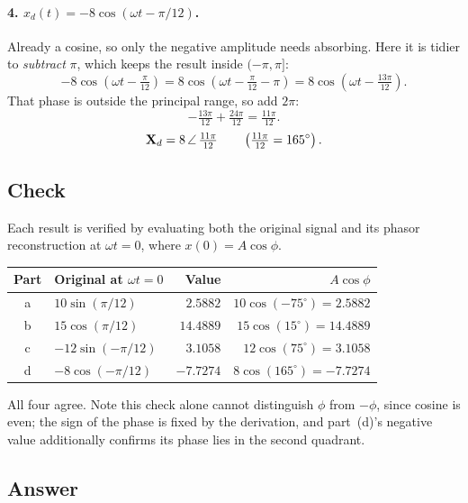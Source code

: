 \paragraph{4. $x_d(t) = -8\cos(\omega t - \pi/12)$.}
Already a cosine, so only the negative amplitude needs absorbing. Here it is
tidier to \emph{subtract} $\pi$, which keeps the result inside $(-\pi, \pi]$:
\begin{equation}
  -8\cos\!\left(\omega t - \tfrac{\pi}{12}\right)
   = 8\cos\!\left(\omega t - \tfrac{\pi}{12} - \pi\right)
   = 8\cos\!\left(\omega t - \tfrac{13\pi}{12}\right).
\end{equation}
That phase is outside the principal range, so add $2\pi$:
\begin{equation}
  -\tfrac{13\pi}{12} + \tfrac{24\pi}{12} = \tfrac{11\pi}{12}.
\end{equation}
\[
  \mathbf{X}_d = 8\,\angle\,\mathord{\tfrac{11\pi}{12}}
  \qquad \left(\tfrac{11\pi}{12} = 165^\circ\right).
\]

\subsection*{Check}

Each result is verified by evaluating both the original signal and its phasor
reconstruction at $\omega t = 0$, where $x(0) = A\cos\phi$.

\begin{center}
\begin{tabular}{clrr}
  \toprule
  Part & Original at $\omega t = 0$ & Value & $A\cos\phi$ \\
  \midrule
  a & $10\sin(\pi/12)$   & $2.5882$   & $10\cos(-75^\circ) = 2.5882$ \\
  b & $15\cos(\pi/12)$   & $14.4889$  & $15\cos(15^\circ) = 14.4889$ \\
  c & $-12\sin(-\pi/12)$ & $3.1058$   & $12\cos(75^\circ) = 3.1058$ \\
  d & $-8\cos(-\pi/12)$  & $-7.7274$  & $8\cos(165^\circ) = -7.7274$ \\
  \bottomrule
\end{tabular}
\end{center}

All four agree. Note this check alone cannot distinguish $\phi$ from $-\phi$,
since cosine is even; the sign of the phase is fixed by the derivation, and
part~(d)'s negative value additionally confirms its phase lies in the second
quadrant.

\subsection*{Answer}

